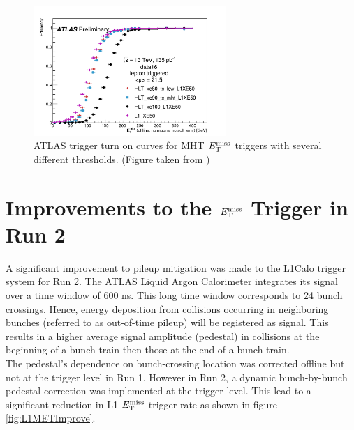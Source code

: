 \begin{figure}[htb]
  \begin{center}
    \includegraphics[width=0.65\textwidth]{figures/trigger/2016-05-16-UpdatedTurnOns.png}\hspace{0.05\textwidth}
\end{center}
\caption{ATLAS trigger turn on curves for MHT $E_{\mathrm{T}}^{\mathrm{miss}}$ triggers with several different thresholds. (Figure taken from \cite{Trigger2016})}
\label{fig:trigTurnON} 
\end{figure}

\section{Improvements to the $E_{\mathrm{T}}^{\mathrm{miss}}$ Trigger in Run 2}
\label{sec:trig:improvements}

\indent A significant improvement to pileup mitigation was made to the L1Calo trigger system for Run 2.\cite{Trigger2015}  The ATLAS Liquid Argon Calorimeter integrates its signal over a time window of $600$ ns.  This long time window corresponds to 24 bunch crossings.  Hence, energy deposition from collisions occurring in neighboring bunches (referred to as out-of-time pileup) will be registered as signal.  This results in a higher average signal amplitude (pedestal) in collisions at the beginning of a bunch train then those at the end of a bunch train.  \\

\indent The pedestal's dependence on bunch-crossing location was corrected offline but not at the trigger level in Run 1.  However in Run 2, a dynamic bunch-by-bunch pedestal correction was implemented at the trigger level.  This lead to a significant reduction in L1 $E_{\mathrm{T}}^{\mathrm{miss}}$ trigger rate as shown in figure \ref{fig:L1METImprove}. \\


